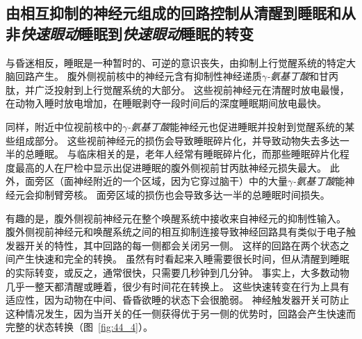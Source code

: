 \subsection{由相互抑制的神经元组成的回路控制从清醒到睡眠和从非\textit{快速眼动}睡眠到\textit{快速眼动}睡眠的转变}

与昏迷相反，睡眠是一种暂时的、可逆的意识丧失，由抑制上行觉醒系统的特定大脑回路产生。
腹外侧视前核中的神经元含有抑制性神经递质\textit{$\gamma$-氨基丁酸}和甘丙肽，并广泛投射到上行觉醒系统的大部分。
这些视前神经元在清醒时放电最慢，在动物入睡时放电增加，在睡眠剥夺一段时间后的深度睡眠期间放电最快。


同样，附近中位视前核中的\textit{$\gamma$-氨基丁酸}能神经元也促进睡眠并投射到觉醒系统的某些组成部分。
这些视前神经元的损伤会导致睡眠碎片化，并导致动物失去多达一半的总睡眠。
与临床相关的是，老年人经常有睡眠碎片化，而那些睡眠碎片化程度最高的人在尸检中显示出促进睡眠的腹外侧视前甘丙肽神经元损失最大。
此外，面旁区（面神经附近的一个区域，因为它穿过脑干）中的大量\textit{$\gamma$-氨基丁酸}能神经元会抑制臂旁核。
面旁区域的损伤也会导致多达一半的总睡眠时间损失。


有趣的是，腹外侧视前神经元在整个唤醒系统中接收来自神经元的抑制性输入。
腹外侧视前神经元和唤醒系统之间的相互抑制连接导致神经回路具有类似于电子触发器开关的特性，其中回路的每一侧都会关闭另一侧。
这样的回路在两个状态之间产生快速和完全的转换。
虽然有时看起来入睡需要很长时间，但从清醒到睡眠的实际转变，或反之，通常很快，只需要几秒钟到几分钟。
事实上，大多数动物几乎一整天都清醒或睡着，很少有时间花在转换上。
这些快速转变在行为上具有适应性，因为动物在中间、昏昏欲睡的状态下会很脆弱。
神经触发器开关可防止这种情况发生，因为当开关的任一侧获得优于另一侧的优势时，回路会产生快速而完整的状态转换（图~\ref{fig:44_4}）。


